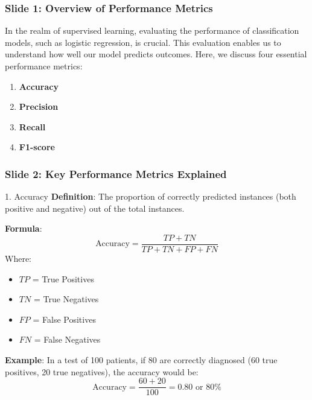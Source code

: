 \documentclass[aspectratio=169]{beamer}
\begin{document}
\begin{frame}[fragile]
    \frametitle{Slide 1: Overview of Performance Metrics}
    In the realm of supervised learning, evaluating the performance of classification models, such as logistic regression, is crucial. This evaluation enables us to understand how well our model predicts outcomes. Here, we discuss four essential performance metrics:
    
    \begin{enumerate}
        \item \textbf{Accuracy}
        \item \textbf{Precision}
        \item \textbf{Recall}
        \item \textbf{F1-score}
    \end{enumerate}
\end{frame}

\begin{frame}[fragile]
    \frametitle{Slide 2: Key Performance Metrics Explained}
    \begin{block}{1. Accuracy}
        \textbf{Definition}: The proportion of correctly predicted instances (both positive and negative) out of the total instances.
        
        \textbf{Formula}:
        \begin{equation}
            \text{Accuracy} = \frac{TP + TN}{TP + TN + FP + FN}
        \end{equation}
        Where:
        \begin{itemize}
            \item $TP$ = True Positives
            \item $TN$ = True Negatives
            \item $FP$ = False Positives
            \item $FN$ = False Negatives
        \end{itemize}
        \textbf{Example}: In a test of 100 patients, if 80 are correctly diagnosed (60 true positives, 20 true negatives), the accuracy would be:
        \begin{equation}
            \text{Accuracy} = \frac{60 + 20}{100} = 0.80 \text{ or } 80\%
        \end{equation}
    \end{block}
\end{frame}
\end{document}
